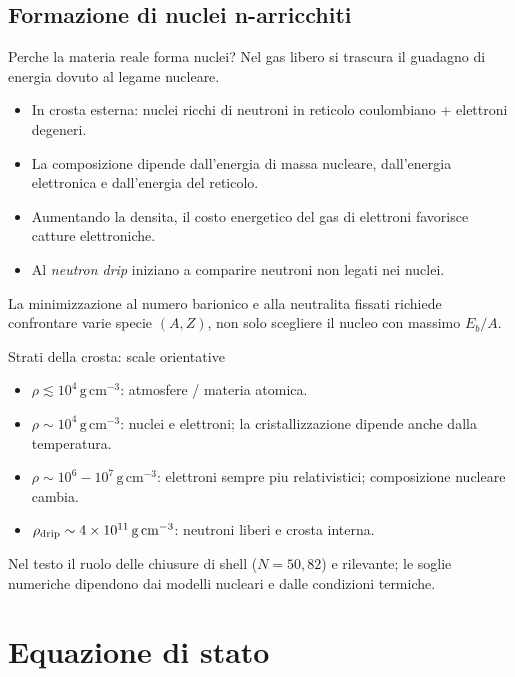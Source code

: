 \subsection{Formazione di nuclei n-arricchiti}

\begin{frame}[t]{Perche la materia reale forma nuclei?}
\vspace*{3mm}
\small
Nel gas libero si trascura il guadagno di energia dovuto al legame nucleare.
\begin{itemize}
\item In crosta esterna: nuclei ricchi di neutroni in reticolo coulombiano + elettroni degeneri.
\item La composizione dipende dall'energia di massa nucleare, dall'energia elettronica e dall'energia del reticolo.
\item Aumentando la densita, il costo energetico del gas di elettroni favorisce catture elettroniche.
\item Al \emph{neutron drip} iniziano a comparire neutroni non legati nei nuclei.
\end{itemize}
La minimizzazione al numero barionico e alla neutralita fissati richiede confrontare varie specie $(A,Z)$, non solo scegliere il nucleo con massimo $E_b/A$.
\end{frame}

\begin{frame}[t]{Strati della crosta: scale orientative}
\vspace*{3mm}
\small
\begin{itemize}
\item $\rho\lesssim10^4\,\mathrm{g\,cm^{-3}}$: atmosfere / materia atomica.
\item $\rho\sim10^4\,\mathrm{g\,cm^{-3}}$: nuclei e elettroni; la cristallizzazione dipende anche dalla temperatura.
\item $\rho\sim10^6\!-\!10^7\,\mathrm{g\,cm^{-3}}$: elettroni sempre piu relativistici; composizione nucleare cambia.
\item $\rho_{\rm drip}\sim4\times10^{11}\,\mathrm{g\,cm^{-3}}$: neutroni liberi e crosta interna.
\end{itemize}
Nel testo il ruolo delle chiusure di shell ($N=50,82$) e rilevante; le soglie numeriche dipendono dai modelli nucleari e dalle condizioni termiche.
\end{frame}

\section{Equazione di stato}

